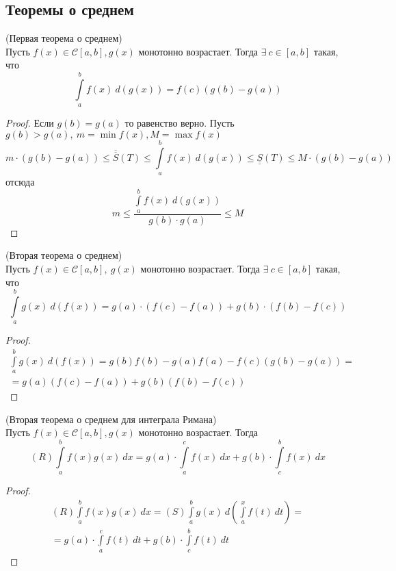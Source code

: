\subsection{Теоремы о среднем}
\begin{theorem}
    (Первая теорема о среднем)\\ 
    Пусть $f(x)\in \mathcal{C}[a,b], g(x)$ монотонно возрастает. Тогда $\exists\ c\in [a,b]$ такая, что
    \[\int\limits_{a}^{b}f(x)\ d(g(x))=f(c)(g(b)-g(a))\]
\end{theorem} 
\begin{proof}
    Если $g(b)=g(a)$ то равенство верно.
    Пусть $g(b)>g(a),\ m=\min f(x), M=\max f(x)$
    \[m\cdot(g(b)-g(a))\leq\overline{\overline{S}}(T) \leq\int\limits_{a}^{b}f(x)\ d(g(x))\leq \underline{\underline{S}}(T)\leq M\cdot(g(b)-g(a))\]
    отсюда
    \[m\leq \frac{\int\limits_{a}^{b}f(x)\ d(g(x))}{g(b)\cdot g(a)}\leq M\]
\end{proof} 
\begin{theorem}
    (Вторая теорема о среднем)\\
    Пусть $f(x)\in \mathcal{C}[a,b],\ g(x)$ монотонно возрастает. Тогда $\exists\ c\in [a,b]$ такая, что
    \[\int\limits_{a}^{b}g(x)\ d(f(x))=g(a)\cdot(f(c)-f(a))+g(b)\cdot (f(b)-f(c))\]
\end{theorem} 
\begin{proof}
    \begin{multline*}
        \int\limits_{a}^{b}g(x)\ d(f(x))=g(b)f(b)-g(a)f(a)-f(c)(g(b)-g(a))=\\=g(a)(f(c)-f(a))+g(b)(f(b)-f(c))
    \end{multline*}
\end{proof} 
\begin{consequense}
    (Вторая теорема о среднем для интеграла Римана)\\
    Пусть $f(x)\in \mathcal{C}[a,b], g(x)$ монотонно возрастает. Тогда
    \[(R)\int\limits_{a}^{b}f(x)g(x)\ dx=g(a)\cdot \int\limits_{a}^{c}f(x)\ dx+g(b)\cdot \int\limits_{c}^{b}f(x)\ dx\]
\end{consequense} 
\begin{proof}
    \begin{multline*}
        (R)\int\limits_{a}^{b}f(x)g(x)\ dx=(S) \int\limits_{a}^{b}g(x)\ d\left(\int\limits_{a}^{x}f(t)\ dt\right)=\\
        =g(a)\cdot \int\limits_{a}^{c}f(t)\ dt+g(b)\cdot \int\limits_{c}^{b}f(t)\ dt
    \end{multline*}
\end{proof} 
